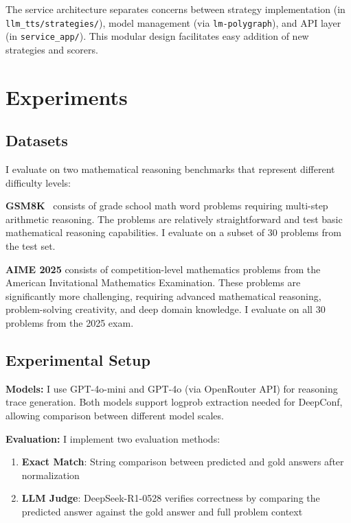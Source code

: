 \documentclass[11pt]{article}
\begin{document}
The service architecture separates concerns between strategy implementation (in \texttt{llm\_tts/strategies/}), model management (via \texttt{lm-polygraph}), and API layer (in \texttt{service\_app/}). This modular design facilitates easy addition of new strategies and scorers.

\section{Experiments}

\subsection{Datasets}

I evaluate on two mathematical reasoning benchmarks that represent different difficulty levels:

\textbf{GSM8K}~\cite{cobbe2021training} consists of grade school math word problems requiring multi-step arithmetic reasoning. The problems are relatively straightforward and test basic mathematical reasoning capabilities. I evaluate on a subset of 30 problems from the test set.

\textbf{AIME 2025} consists of competition-level mathematics problems from the American Invitational Mathematics Examination. These problems are significantly more challenging, requiring advanced mathematical reasoning, problem-solving creativity, and deep domain knowledge. I evaluate on all 30 problems from the 2025 exam.

\subsection{Experimental Setup}

\textbf{Models:} I use GPT-4o-mini and GPT-4o (via OpenRouter API) for reasoning trace generation. Both models support logprob extraction needed for DeepConf, allowing comparison between different model scales.

\textbf{Evaluation:} I implement two evaluation methods:
\begin{enumerate}
    \item \textbf{Exact Match}: String comparison between predicted and gold answers after normalization
    \item \textbf{LLM Judge}: DeepSeek-R1-0528 verifies correctness by comparing the predicted answer against the gold answer and full problem context
\end{enumerate}
\end{document}
